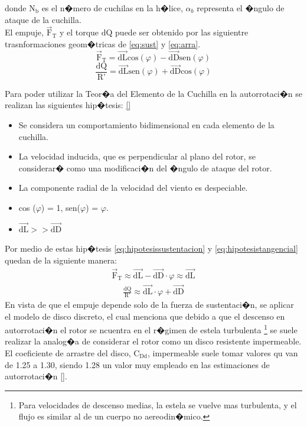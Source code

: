 \documentclass[10pt,a4paper]{book}
\begin{document}
 donde $\text{N}_{\text{b}}$ es el n�mero de cuchilas en la h�lice, $\alpha_{b}$ representa el �ngulo de ataque de la cuchilla. \\
 
 El empuje, $\overrightarrow{\text{F}}_{\text{T}}$ y el torque $\text{dQ}$ puede ser obtenido por las siguientre trasnformaciones geom�tricas de \eqref{eq:sust} y \eqref{eq:arra}.
 \begin{equation}
 \label{eq:hipotesissustentacion}
\overrightarrow{\text{F}}_{\text{T}} =\overrightarrow{\text{dL}}\text{cos}(\varphi) - \overrightarrow{\text{dD}}\text{sen}(\varphi)
\end{equation}
\begin{equation}
 \label{eq:hipotesistangencial}
 \frac{\text{dQ}}{\text{R'}} = \overrightarrow{\text{dL}}\text{sen}(\varphi) + \overrightarrow{\text{dD}}\text{cos}(\varphi)
\end{equation}


Para poder utilizar la Teor�a del Elemento de la Cuchilla en la autorrotaci�n se realizan las siguientes hip�tesis: \ref{}
\begin{itemize}
\item Se considera un comportamiento bidimensional en cada elemento de la cuchilla.
\item La velocidad inducida, que es perpendicular al plano del rotor, se considerar� como una modificaci�n del �ngulo de ataque del rotor.
\item La componente radial de la velocidad del viento es despeciable.
\item cos ($\varphi$)  = 1, sen($\varphi$) = $\varphi$.
\item $\overrightarrow{\text{dL}} >> \overrightarrow{\text{dD}}$  
\end{itemize}

Por medio de estas hip�tesis  \ref{eq:hipotesissustentacion} y \ref{eq:hipotesistangencial} quedan de la siguiente manera:
\begin{align}
\label{eq:sustentacion}
\overrightarrow{\text{F}}_{\text{T}} \approx \overrightarrow{\text{dL}} - \overrightarrow{\text{dD}} \cdot \varphi \approx \overrightarrow{\text{dL}}
\end{align}
\begin{align}
 \frac{\text{dQ}}{\text{R'}} \approx \overrightarrow{\text{dL}}\cdot \varphi  + \overrightarrow{\text{dD}}
\end{align}
En vista de que el empuje depende solo de la fuerza de sustentaci�n, se aplicar el modelo de disco discreto, el cual menciona que debido a que el descenso en autorrotaci�n el rotor se ncuentra en el r�gimen de estela turbulenta \footnote{Para velocidades de descenso medias, la estela se vuelve mas turbulenta, y el flujo es similar al de un cuerpo no aereodin�mico.} se suele realizar la analog�a de considerar el rotor como un disco resistente impermeable. \\
El coeficiente de arrastre del disco, $\text{C}_{\text{Dd}}$, impermeable suele tomar valores qu van de 1.25 a 1.30, siendo 1.28 un valor muy empleado en las estimaciones de autorrotaci�n \ref{}.\\
\end{document}
